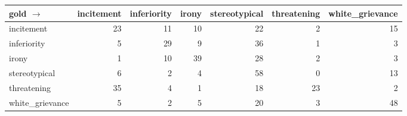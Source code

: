 \begin{tabular}{lrrrrrr}
\toprule
gold $\to$  & incitement & inferiority & irony & stereotypical & threatening & white\_grievance \\
\midrule
incitement & 23 & 11 & 10 & 22 & 2 & 15 \\
inferiority & 5 & 29 & 9 & 36 & 1 & 3 \\
irony & 1 & 10 & 39 & 28 & 2 & 3 \\
stereotypical & 6 & 2 & 4 & 58 & 0 & 13 \\
threatening & 35 & 4 & 1 & 18 & 23 & 2 \\
white\_grievance & 5 & 2 & 5 & 20 & 3 & 48 \\
\bottomrule
\end{tabular}
